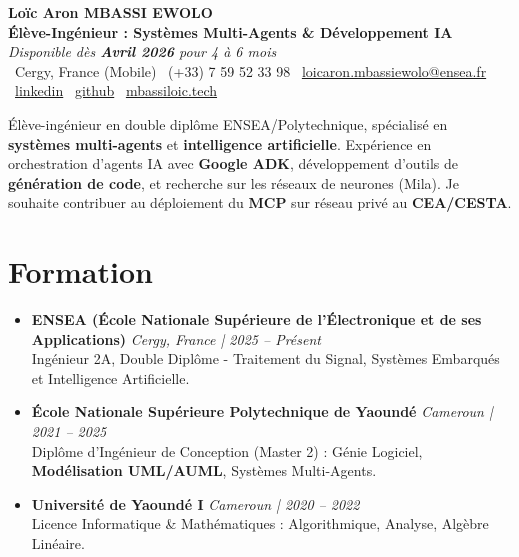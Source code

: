 \documentclass[a4paper,11pt]{article}
\begin{document}
\begin{center}
    {\Large \textbf{Loïc Aron MBASSI EWOLO}} \\ \vspace{4pt}
    \textbf{\large Élève-Ingénieur : Systèmes Multi-Agents \& Développement IA} \\
    \textit{\small Disponible dès \textbf{Avril 2026} pour 4 à 6 mois} \\ \vspace{4pt}
    \small
    \faMapMarker\ Cergy, France (Mobile) \quad
    \faPhone\ (+33) 7 59 52 33 98 \quad
    \faEnvelope\ \href{mailto:loicaron.mbassiewolo@ensea.fr}{loicaron.mbassiewolo@ensea.fr} \\ \vspace{2pt}
    \faLinkedin\ \href{https://www.linkedin.com/in/loic-aron-mbassi-ewolo-3942a9246/}{linkedin} \quad
    \faGithub\ \href{https://github.com/Nameless0l}{github} \quad
    \faGlobe\ \href{https://mbassiloic.tech}{mbassiloic.tech}
\end{center}

\vspace{-6pt}

\noindent\small{Élève-ingénieur en double diplôme ENSEA/Polytechnique, spécialisé en \textbf{systèmes multi-agents} et \textbf{intelligence artificielle}. Expérience en orchestration d'agents IA avec \textbf{Google ADK}, développement d'outils de \textbf{génération de code}, et recherche sur les réseaux de neurones (Mila). Je souhaite contribuer au déploiement du \textbf{MCP} sur réseau privé au \textbf{CEA/CESTA}.}

\section{Formation}
\begin{itemize}[leftmargin=*, label={.}, nosep]
    \item \textbf{ENSEA (École Nationale Supérieure de l'Électronique et de ses Applications)} \hfill \textit{Cergy, France | 2025 -- Présent} \\
    \small{Ingénieur 2A, Double Diplôme - Traitement du Signal, Systèmes Embarqués et Intelligence Artificielle.}
    \vspace{2pt}
    \item \textbf{École Nationale Supérieure Polytechnique de Yaoundé} \hfill \textit{Cameroun | 2021 -- 2025} \\
    \small{Diplôme d'Ingénieur de Conception (Master 2) : Génie Logiciel, \textbf{Modélisation UML/AUML}, Systèmes Multi-Agents.}
    \item \textbf{Université de Yaoundé I} \hfill \textit{Cameroun | 2020 -- 2022} \\
    \small{Licence Informatique \& Mathématiques : Algorithmique, Analyse, Algèbre Linéaire.}
\end{itemize}
\end{document}
